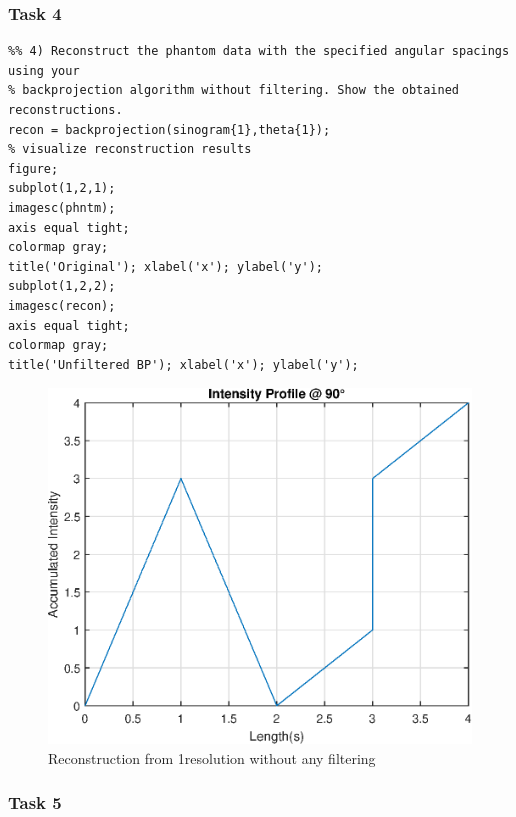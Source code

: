 \clearpage
\newpage


\subsubsection*{Task 4}

\begin{lstlisting}
%% 4) Reconstruct the phantom data with the specified angular spacings using your
% backprojection algorithm without filtering. Show the obtained reconstructions.
recon = backprojection(sinogram{1},theta{1});
% visualize reconstruction results
figure;
subplot(1,2,1);
imagesc(phntm);
axis equal tight;
colormap gray;
title('Original'); xlabel('x'); ylabel('y');
subplot(1,2,2);
imagesc(recon);
axis equal tight;
colormap gray;
title('Unfiltered BP'); xlabel('x'); ylabel('y');
\end{lstlisting}
\begin{figure}[htb!]
  \centering
  \includegraphics[width=\linewidth]{homework1/img/7.eps}
  \caption{Reconstruction from 1\textdegree resolution without any filtering}
  \label{fig:recon_1deg}
\end{figure}

\clearpage
\newpage


\subsubsection*{Task 5}

